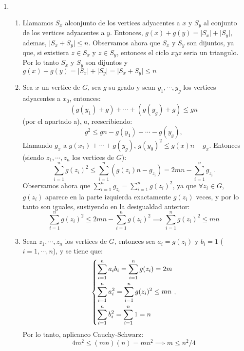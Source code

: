 \documentclass{article}
\begin{document}
\begin{enumerate}
\item \begin{enumerate}
\item Llamamos $S_x$ alconjunto de los vertices adyacentes a $x$ y $S_y$ al conjunto de los
vertices adyacentes a $y$. Entonces, $g(x) + g(y) = \lvert S_x \rvert + \lvert S_y \rvert$, ademas,
$\lvert S_x + S_y \rvert \leq n$. Observamos ahora que $S_x$ y $S_y$ son dijuntos, ya que, si
existiera $z \in S_x$ y $z \in S_y$, entonces el ciclo $xyz$ seria un triangulo. Por lo tanto $S_x$ y
$S_y$ son dijuntos y $g(x) + g(y) = \lvert S_x \rvert + \lvert S_y \rvert = \lvert S_x + S_y \rvert \leq n$

\item Sea $x$ un vertice de $G$, sea $g$ su grado y sean $y_1, \cdots, y_g$ los vertices adyacentes
a $x_0$, entonces:
\[
\left( g(y_1) + g \right) + \cdots + \left( g(y_g) + g \right) \leq gn
\]
(por el apartado a), o, reescribiendo:
\[
g^2 \leq gn - g(y_1) - \cdots - g(y_g),
\]
Llamando $g_x$ a $g(x_1) + \cdots + g(y_g)$, $g(y_0)^2 \leq g(x)n - g_x$. Entonces (siendo 
$z_1, \cdots, z_n$ los vertices de $G$):
\[
\sum_{i=1}^n g(z_i)^2 \leq \sum_{i=1}^n \left( g(z_i)n - g_{z_i} \right) = 2mn - \sum_{i=1}^n g_{z_i}.
\]
Observamos ahora que $\sum_{i=1}^n g_{z_i} = \sum_{i=1}^n g(z_i)^2$, ya que $\forall z_i \in G$,
$g(z_i)$ aparece en la parte izquierda exactamente $g(z_i)$ veces, y por lo tanto son iguales,
sustiyendo en la desigualdad anterior:
\[
\sum_{i=1}^n g(z_i)^2 \leq 2mn - \sum_{i=1}^n g(z_i)^2
\implies
\sum_{i=1}^n g(z_i)^2 \leq mn
\]

\item Sean $z_1, \cdots, z_n$ los vertices de $G$, entonces sea $a_i = g(z_i)$ y $b_i = 1$
($i = 1, \cdots, n$), y se tiene que:
\[
\begin{dcases}
\sum_{i=1}^n a_ib_i =\sum_{i=1}^n g(z_i) = 2m \\
\sum_{i=1}^n a_i^2 = \sum_{i=1}^n g(z_i)^2 \leq mn \\
\sum_{i=1}^n b_i^2 = \sum_{i=1}^n 1 = n
\end{dcases}.
\]
Por lo tanto, aplicanco Cauchy-Schwarz:
\[
4m^2 \leq (mn)(n) = mn^2 \implies m \leq n^2/4
\]
\end{enumerate}
\end{enumerate}
\end{document}
